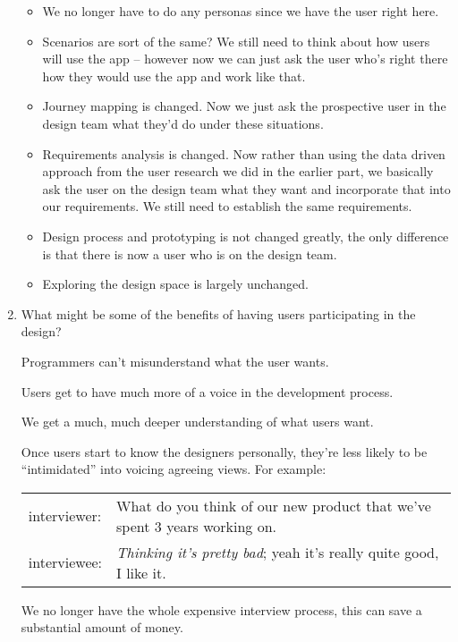 \documentclass[10pt,\jkfside,a4paper]{article}
\begin{document}
\begin{enumerate}[label=(\alph*)]
\begin{itemize}
\item We no longer have to do any personas since we have the user right here.

\item Scenarios are sort of the same? We still need to think about how users will use the app -- however now we can
just ask the user who's right there how they would use the app and work like that.

\item Journey mapping is changed. Now we just ask the prospective user in the design team what they'd do under these
situations.

\item Requirements analysis is changed. Now rather than using the data driven approach from the user research we did
in the earlier part, we basically ask the user on the design team what they want and incorporate that into our
requirements. We still need to establish the same requirements.

\item Design process and prototyping is not changed greatly, the only difference is that there is now a user who is
on the design team.

\item Exploring the design space is largely unchanged.

\end{itemize}

\item What might be some of the benefits of having users participating in the design?

Programmers can't misunderstand what the user wants.

Users get to have much more of a voice in the development process.

We get a much, much deeper understanding of what users want.

Once users start to know the designers personally, they're less likely to be ``intimidated'' into
voicing agreeing views.
For example:

\label{tab:discussion}
\begin{tabular}{l l}
interviewer: & What do you think of our new product that we've spent 3 years working on. \\
interviewee: & \textit{Thinking it's pretty bad}; yeah it's really quite good, I like it. \\
\end{tabular}

We no longer have the whole expensive interview process, this can save a substantial amount of money.


\end{enumerate}
\end{document}
